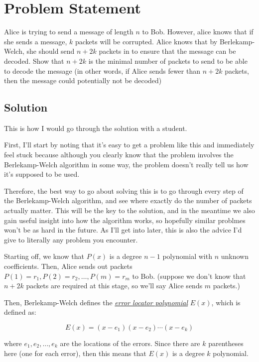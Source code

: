 \documentclass[10pt]{article}
\begin{document}
    \section*{Problem Statement}

    Alice is trying to send a message of length $n$ to Bob. However, alice knows that if she sends a message, $k$ packets will be corrupted. Alice knows that by Berlekamp-Welch, she should send $n + 2k$ packets in to ensure that the message can be decoded. Show that $n+2k$ is the minimal number of packets to send to be able to decode the message (in other words, if Alice sends fewer than $n+2k$ packets, then the message could potentially not be decoded)

    \subsection*{Solution}

    This is how I would go through the solution with a student. 
    
    First, I'll start by noting that it's easy to get a problem like this and immediately feel stuck because although you clearly know that the problem involves the Berlekamp-Welch algorithm in some way, the problem doesn't really tell us how it's supposed to be used. 

    Therefore, the best way to go about solving this is to go through every step of the Berlekamp-Welch algorithm, and see where exactly do the number of packets actually matter. This will be the key to the solution, and in the meantime we also gain useful insight into how the algorithm works, so hopefully similar problmes won't be as hard in the future. As I'll get into later, this is also the advice I'd give to literally any problem you encounter.
    
    Starting off, we know that $P(x)$ is a degree $n-1$ polynomial with $n$ unknown coefficients. Then, Alice sends out packets $P(1) = r_1, P(2) = r_2, \dots, P(m) = r_{m}$ to Bob. (suppose we don't know that $n+2k$ packets are required at this stage, so we'll say Alice sends $m$ packets.)

    Then, Berlekamp-Welch defines the \underline{\textit{error locator polynomial}} $E(x)$, which is defined as:

    \[ E(x) = (x - e_1)(x - e_2) \cdots (x - e_k)\] 

    where $e_1, e_2, \dots, e_k$ are the locations of the errors. Since there are $k$ parentheses here (one for each error), then this means that $E(x)$ is a degree $k$ polynomial. 
    
\end{document}
